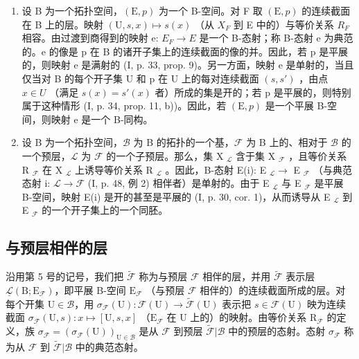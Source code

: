 \begin{enumerate}
\def\labelenumi{\arabic{enumi})}
\setcounter{enumi}{1}
\item
  设 B 为一个拓扑空间，\((\mathrm{E},p)\) 为一个 B-空间。对 F 取 \((\mathrm{E},p)\) 的连续截面在 B 上的层。映射 \((\mathrm{U},s,x)\mapsto s(x)\) （从 \(X_{F}\) 到 E 中的）与等价关系 \(R_{F}\) 相容。由过渡到商得到的映射 e: \(E_{F}\to E\) 是一个 B-态射；称 B-态射 e 为典范的。e 的像是 p 在 B 的诸开子集上的连续截面的像的并。因此，若 p 是平展的，则映射 e 是满射的 (I, p. 33, prop. 9)。另一方面，映射 e 是单射的，当且仅当对 B 的每个开子集 U 和 p 在 U 上的每对连续截面 \((s,s')\) ，由点 \(x\in U\) （满足 \(s(x)=s'(x)\) 者）所成的集是开的；若 p 是平展的，则特别属于这种情形 (I, p. 34, prop. 11, b))。因此，若 \((\mathrm{E},p)\) 是一个平展 B-空间，则映射 e 是一个 B-同构。
\item
  设 B 为一个拓扑空间，\(\mathcal{B}\) 为 B 的拓扑的一个基，\(\mathcal{F}\) 为 B 上的、相对于 \(\mathcal{B}\) 的一个预层，\(\mathcal{L}\) 为 \(\mathcal{F}\) 的一个子预层。那么，集 X \(_{\mathcal{L}}\) 含于集 X \(_{\mathcal{F}}\) ，且等价关系 R \(_{\mathcal{F}}\) 在 X \(_{\mathcal{L}}\) 上诱导等价关系 R \(_{\mathcal{L}}\) 。因此，B-态射 E(i): E \(_{\mathcal{L}} \to\) E \(_{\mathcal{F}}\) （与典范态射 i: \(\mathcal{L} \to \mathcal{F}\) (I, p. 48, 例 2) 相伴者）是单射的。由于 E \(_{\mathcal{L}}\) 与 E \(_{\mathcal{F}}\) 是平展 B-空间，映射 E(i) 是开的甚至是平展的 (I, p. 30, cor. 1)，从而诱导从 E \(_{\mathcal{L}}\) 到 E \(_{\mathcal{F}}\) 的一个开子集上的一个同胚。
\end{enumerate}

\subsection{与预层相伴的层}

沿用第 5 号的记号，我们把 \(\widetilde{\mathcal{F}}\) 称为与预层 \(\mathcal{F}\) 相伴的层，并用 \(\widetilde{\mathcal{F}}\) 表示层 \(\underline{\mathcal{L}}(\mathrm{B};\mathrm{E}_{\mathcal{F}})\)，即平展 B-空间 \(\mathrm{E}_{\mathcal{F}}\) （与预层 \(\mathcal{F}\) 相伴的）的连续截面所成的层。对每个开集 \(\mathrm{U}\in\mathcal{B}\)，用 \(\sigma_{\mathcal{F}}(\mathrm{U})\colon\mathcal{F}(\mathrm{U})\to\widetilde{\mathcal{F}}(\mathrm{U})\) 表示把 \(s\in\mathcal{F}(\mathrm{U})\) 映为连续截面 \(\sigma_{\mathcal{F}}(\mathrm{U},s)\colon x\mapsto[\mathrm{U},s,x]\) （\(\mathrm{E}_{\mathcal{F}}\) 在 U 上的）的映射。由等价关系 \(\mathrm{R}_{\mathcal{F}}\) 的定义，族 \(\sigma_{\mathcal{F}}=(\sigma_{\mathcal{F}}(\mathrm{U}))_{\mathrm{U}\in\mathcal{B}}\) 是从 \(\mathcal{F}\) 到预层 \(\widetilde{\mathcal{F}}|\mathcal{B}\) 中的预层的态射。态射 \(\sigma_{\mathcal{F}}\) 称为从 \(\mathcal{F}\) 到 \(\widetilde{\mathcal{F}}|\mathcal{B}\) 中的典范态射。

